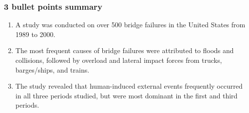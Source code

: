\documentclass[
  letterpaper,
  DIV=11,
  numbers=noendperiod]{scrreprt}
\providecommand{\tightlist}{%
  \setlength{\itemsep}{0pt}\setlength{\parskip}{0pt}}\usepackage{longtable,booktabs,array}
\begin{document}
\hypertarget{bullet-points-summary-21}{%
\subsubsection{3 bullet points summary}\label{bullet-points-summary-21}}

\begin{enumerate}
\def\labelenumi{\arabic{enumi}.}
\tightlist
\item
  A study was conducted on over 500 bridge failures in the United States
  from 1989 to 2000.
\item
  The most frequent causes of bridge failures were attributed to floods
  and collisions, followed by overload and lateral impact forces from
  trucks, barges/ships, and trains.
\item
  The study revealed that human-induced external events frequently
  occurred in all three periods studied, but were most dominant in the
  first and third periods.
\end{enumerate}
\end{document}

